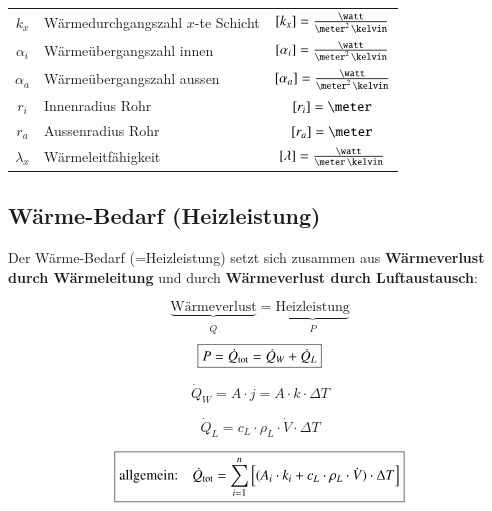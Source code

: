 \renewcommand{\arraystretch}{1.3}
\begin{tabular}{c l c}
	$k_x$ 		& Wärmedurchgangszahl $x$-te Schicht 	& $[k_x] = \frac{\watt}{\meter^2 \, \kelvin}$ 		\\
	$\alpha_i$ 	& Wärmeübergangszahl innen 				& $[\alpha_i] = \frac{\watt}{\meter^2 \, \kelvin}$	\\
	$\alpha_a$ 	& Wärmeübergangszahl aussen 			& $[\alpha_a] = \frac{\watt}{\meter^2 \, \kelvin}$ 	\\
	$r_i$ 		& Innenradius Rohr 						& $[r_i] = \meter$									\\
	$r_a$ 		& Aussenradius Rohr 					& $[r_a] = \meter$									\\
	$\lambda_x$ & Wärmeleitfähigkeit 					& $[\lambda] = \frac{\watt}{\meter \, \kelvin}$
\end{tabular}
\renewcommand{\arraystretch}{1}


\subsection{Wärme-Bedarf (Heizleistung)}

Der Wärme-Bedarf (=Heizleistung) setzt sich zusammen aus \textbf{Wärmeverlust durch Wärmeleitung} und durch
\textbf{Wärmeverlust durch Luftaustausch}: 

$$ \underbrace{\text{Wärmeverlust}}_{\substack{\dot{Q}}}  = \underbrace{\text{Heizleistung}}_{\substack{P}} $$
$$ \boxed{ P = \dot{Q}_{\rm tot} = \dot{Q}_W + \dot{Q}_L }  $$

\begin{minipage}{0.4\columnwidth}
	$$ \boxed{ \dot{Q}_W = A \cdot j = A \cdot k \cdot \Delta T } $$
\end{minipage}
\hfill
\begin{minipage}{0.4\columnwidth}
	$$ \boxed{ \dot{Q}_L = c_L \cdot \rho_L \cdot \dot{V} \cdot \Delta T} $$
\end{minipage}

$$ \boxed{ \text{allgemein:} \quad \dot{Q}_{\rm tot} = \sum_{i=1}^n  \Big[ (A_i \cdot k_i + c_L \cdot \rho_L \cdot \dot{V} ) \cdot \Delta T \Big] } $$


